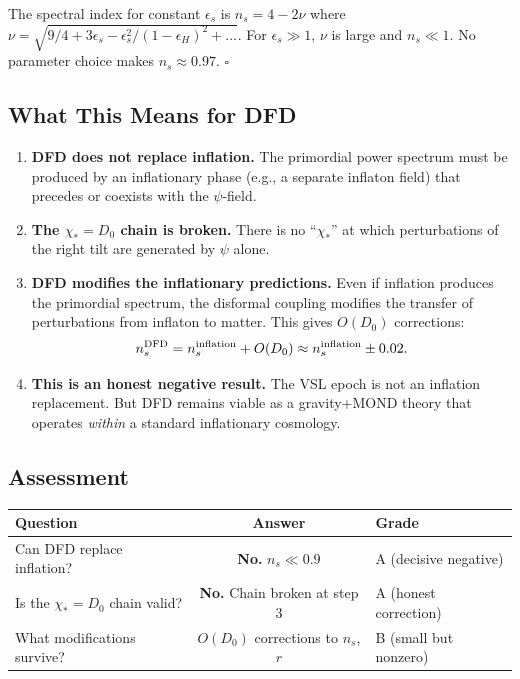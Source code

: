 \documentclass[11pt,a4paper]{article}
\begin{document}
The spectral index for constant $\epsilon_s$ is $n_s = 4 - 2\nu$ where $\nu = \sqrt{9/4 + 3\epsilon_s - \epsilon_s^2/(1-\epsilon_H)^2 + \ldots}$. For $\epsilon_s \gg 1$, $\nu$ is large and $n_s \ll 1$. No parameter choice makes $n_s \approx 0.97$. $\square$

\subsection{What This Means for DFD}

\begin{enumerate}
\item \textbf{DFD does not replace inflation.} The primordial power spectrum must be produced by an inflationary phase (e.g., a separate inflaton field) that precedes or coexists with the $\psi$-field.
\item \textbf{The $\chi_* = D_0$ chain is broken.} There is no ``$\chi_*$'' at which perturbations of the right tilt are generated by $\psi$ alone.
\item \textbf{DFD modifies the inflationary predictions.} Even if inflation produces the primordial spectrum, the disformal coupling modifies the transfer of perturbations from inflaton to matter. This gives $O(D_0)$ corrections:
\begin{equation}
n_s^{\rm DFD} = n_s^{\rm inflation} + O(D_0) \approx n_s^{\rm inflation} \pm 0.02.
\end{equation}
\item \textbf{This is an honest negative result.} The VSL epoch is not an inflation replacement. But DFD remains viable as a gravity+MOND theory that operates \emph{within} a standard inflationary cosmology.
\end{enumerate}

\subsection{Assessment}

\begin{center}
\begin{tabular}{lcl}
\toprule
\textbf{Question} & \textbf{Answer} & \textbf{Grade} \\
\midrule
Can DFD replace inflation? & \textbf{No.} $n_s \ll 0.9$ & A (decisive negative) \\
Is the $\chi_* = D_0$ chain valid? & \textbf{No.} Chain broken at step 3 & A (honest correction) \\
What modifications survive? & $O(D_0)$ corrections to $n_s$, $r$ & B (small but nonzero) \\
\bottomrule
\end{tabular}
\end{center}
\end{document}
